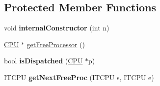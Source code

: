 \subsection*{Protected Member Functions}
\begin{DoxyCompactItemize}
\item 
void {\bfseries internal\+Constructor} (int n)\hypertarget{classRTSim_1_1MRTKernel_ae85739cf98fd842184b3fbefd4a7a482}{}\label{classRTSim_1_1MRTKernel_ae85739cf98fd842184b3fbefd4a7a482}

\item 
\hyperlink{classRTSim_1_1CPU}{C\+PU} $\ast$ \hyperlink{classRTSim_1_1MRTKernel_a2c894e825ebef88417decac4bd29388b}{get\+Free\+Processor} ()
\item 
bool {\bfseries is\+Dispatched} (\hyperlink{classRTSim_1_1CPU}{C\+PU} $\ast$p)\hypertarget{classRTSim_1_1MRTKernel_a1b718cfa78c6f0811c9714c31918ad6f}{}\label{classRTSim_1_1MRTKernel_a1b718cfa78c6f0811c9714c31918ad6f}

\item 
I\+T\+C\+PU {\bfseries get\+Next\+Free\+Proc} (I\+T\+C\+PU s, I\+T\+C\+PU e)\hypertarget{classRTSim_1_1MRTKernel_aec7e4f34a3fece23b944a64c61e47b8e}{}\label{classRTSim_1_1MRTKernel_aec7e4f34a3fece23b944a64c61e47b8e}

\end{DoxyCompactItemize}
